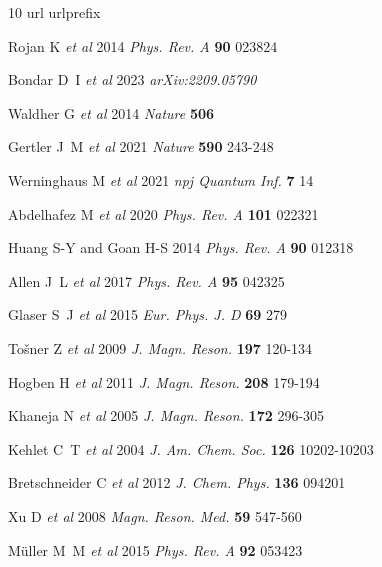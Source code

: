 \documentclass[letterpaper,10pt]{iopart}
\begin{document}
\begin{thebibliography}{10}
\expandafter\ifx\csname url\endcsname\relax
  \def\url#1{{\tt #1}}\fi
\expandafter\ifx\csname urlprefix\endcsname\relax\def\urlprefix{URL }\fi
\providecommand{\eprint}[2][]{\url{#2}}

Rojan K {\em et al\/} 2014 {\em Phys. Rev. A\/} {\bf 90} 023824

Bondar D~I {\em et al\/} 2023 {\em arXiv:2209.05790\/}

Waldher G {\em et al} 2014 {\em Nature\/} {\bf 506}  

Gertler J~M {\em et al\/} 2021 {\em Nature\/} {\bf 590} 243-248  

Werninghaus M {\em et al\/} 2021 {\em npj Quantum Inf.} {\bf 7} 14


Abdelhafez M {\em et al\/} 2020 {\em Phys. Rev. A} {\bf101} 022321 

Huang S-Y and Goan H-S 2014 {\em Phys. Rev. A} {\bf90} 012318 

Allen J~L {\em et al\/} 2017 {\em Phys. Rev. A\/} {\bf95} 042325  

Glaser S~J {\em et al\/} 2015 {\em Eur. Phys. J. D\/} {\bf69} 279

Tošner Z  {\em et al\/} 
2009 
{\em J. Magn. Reson.} 
{\bf197} 120-134 

Hogben H {\em et al\/} 
2011
{\em J. Magn. Reson.} 
{\bf208} 179-194  

Khaneja N {\em et al\/} 
2005
{\em J. Magn. Reson.}  {\bf172} 296-305 

Kehlet C~T {\em et al\/} 
2004
{\em J. Am. Chem. Soc. }
{\bf126} 10202-10203  

Bretschneider C {\em et al\/} 
2012
{\em J. Chem. Phys.}
{\bf136} 094201 

Xu D {\em et al\/} 
2008
{\em Magn. Reson. Med.}
\textbf{59} 547-560  

Müller M~M {\em et al\/} 
2015
{\em Phys. Rev. A}
{\bf92} 053423 


\end{thebibliography}
\end{document}
